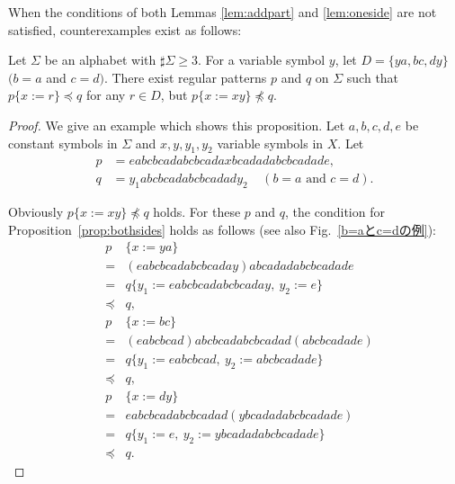 When the conditions of both Lemmas \ref{lem:addpart} and \ref{lem:oneside} are not satisfied, counterexamples exist as follows:

\begin{prop}\label{prop:bothsides}
  Let $\Sigma$ be an alphabet with $\sharp \Sigma \ge 3$.
  For a variable symbol $y$, let $D= \{ ya, bc, dy \}$ $(b = a$ and $c = d)$. There exist regular patterns $p$ and $q$ on $\Sigma$ such that $p \{ x := r \} \preceq q$ for any $r \in D$, but $p \{ x := xy \} \not \preceq q$.
\end{prop}

\begin{proof}
We give an example which shows this proposition.
Let $a,b,c,d,e$ be constant symbols in $\Sigma$ and 
$x,y,y_{1},y_{2}$ variable symbols in $X$.
Let 
\begin{align*}
p &= eabcbcadabcbcadaxbcadadabcbcadade,\\
q &= y_{1}abcbcadabcbcadady_{2}~~~~~(b = a\mbox{~and~}c = d).
\end{align*}

\noindent
Obviously $p \{ x:=xy \} \not \preceq q$ holds.
For these $p$ and $q$, the condition for Proposition~\ref{prop:bothsides} holds as follows (see also Fig.~\ref{b=aとc=dの例}):
\begin{eqnarray*}
&p& \{ x:=ya \} \\ 
& = & (eabcbcadabcbcaday)abcadadabcbcadade\\
& = & q \{ y_{1} := eabcbcadabcbcaday,~y_{2}:=e \} \\
& \preceq & q,\\
&p& \{ x:=bc \}  \\
& = & (eabcbcad)abcbcadabcbcadad(abcbcadade) \\
& = & q \{ y_{1} := eabcbcad,~y_{2} := abcbcadade \} \\
& \preceq & q,\\
&p& \{ x:=dy \}  \\
& = & eabcbcadabcbcadad(ybcadadabcbcadade) \\
& = & q \{ y_{1}:=e,~y_{2} := ybcadadabcbcadade \} \\
& \preceq & q.
\end{eqnarray*}
\end{proof}

